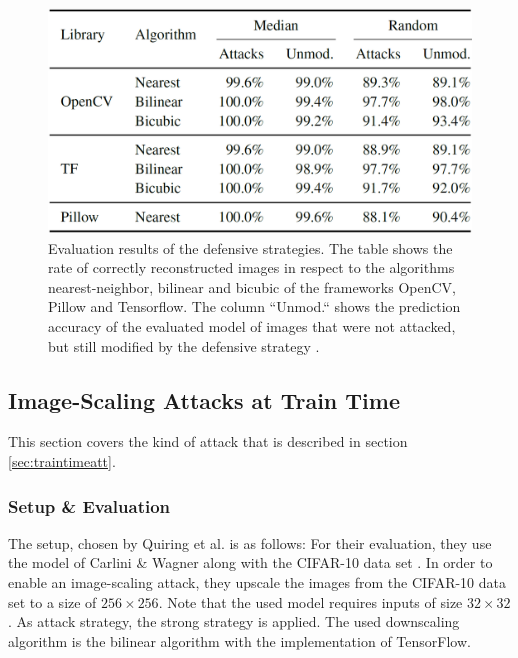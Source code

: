\documentclass[sigconf]{acmart}
\begin{document}
\begin{figure}[h]
  \centering
  \includegraphics[width=\linewidth]{img/defRes.png}
  \caption{Evaluation results of the defensive strategies. The table shows the rate of correctly reconstructed images in respect to the algorithms nearest-neighbor, bilinear and bicubic of the frameworks OpenCV, Pillow and Tensorflow. 
  		The column ``Unmod.`` shows the prediction accuracy of the evaluated model of images that were not attacked, but still modified by the defensive strategy \cite{imgscale}.}
  \Description{}
  \label{fig:defRes}
\end{figure}

\subsection{Image-Scaling Attacks at Train Time}
This section covers the kind of attack that is described in section \ref{sec:traintimeatt}.

\subsubsection{Setup \& Evaluation}
The setup, chosen by Quiring et al.\cite{imgscalepoison} is as follows:
For their evaluation, they use the model of Carlini \& Wagner \cite{7958570} along with the CIFAR-10 data set \cite{cifar}.
In order to enable an image-scaling attack, they upscale the images from the CIFAR-10 data set to a size of $256 \times 256$.
Note that the used model requires inputs of size $32 \times 32$.
As attack strategy, the strong strategy is applied.
The used downscaling algorithm is the bilinear algorithm with the implementation of TensorFlow.
\end{document}
